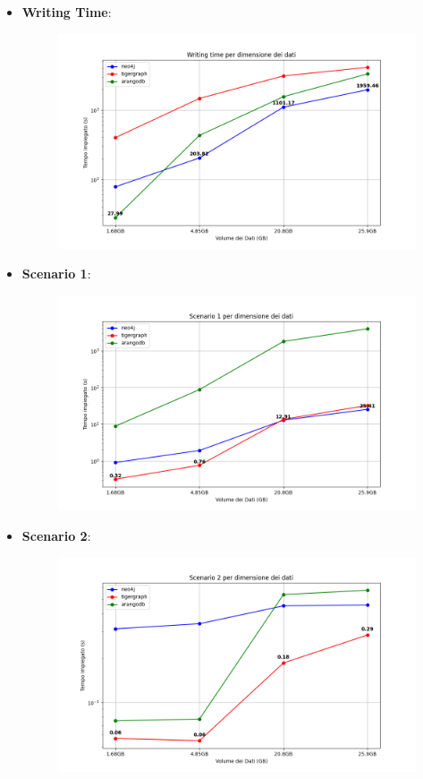 \documentclass[11pt]{article}
\begin{document}
\begin{itemize}
    \item \textbf{Writing Time}:
    \begin{figure}[!ht]
        \centering
        \includegraphics[width=\textwidth]{./images/plot_results/wtime.png}
    \end{figure}

    \newpage
    \item \textbf{Scenario 1}:
    \begin{figure}[!ht]
        \centering
        \includegraphics[width=\textwidth]{./images/plot_results/scenario1.png}
    \end{figure}

    \item \textbf{Scenario 2}:
    \begin{figure}[!ht]
        \centering
        \includegraphics[width=\textwidth]{./images/plot_results/scenario2.png}
    \end{figure}


\end{itemize}
\end{document}
